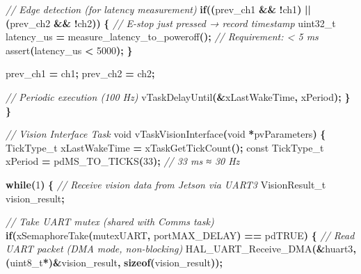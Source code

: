 \documentclass[
]{article}
\newenvironment{Shaded}{\begin{snugshade}}{\end{snugshade}}
\newcommand{\CommentTok}[1]{\textcolor[rgb]{0.56,0.35,0.01}{\textit{#1}}}
\newcommand{\ControlFlowTok}[1]{\textcolor[rgb]{0.13,0.29,0.53}{\textbf{#1}}}
\newcommand{\DataTypeTok}[1]{\textcolor[rgb]{0.13,0.29,0.53}{#1}}
\newcommand{\DecValTok}[1]{\textcolor[rgb]{0.00,0.00,0.81}{#1}}
\newcommand{\KeywordTok}[1]{\textcolor[rgb]{0.13,0.29,0.53}{\textbf{#1}}}
\newcommand{\NormalTok}[1]{#1}
\newcommand{\OperatorTok}[1]{\textcolor[rgb]{0.81,0.36,0.00}{\textbf{#1}}}
\begin{document}
\begin{Shaded}
\begin{Highlighting}[]
        \CommentTok{// Edge detection (for latency measurement)}
        \ControlFlowTok{if}\OperatorTok{((}\NormalTok{prev\_ch1 }\OperatorTok{\&\&} \OperatorTok{!}\NormalTok{ch1}\OperatorTok{)} \OperatorTok{||} \OperatorTok{(}\NormalTok{prev\_ch2 }\OperatorTok{\&\&} \OperatorTok{!}\NormalTok{ch2}\OperatorTok{))} \OperatorTok{\{}
            \CommentTok{// E{-}stop just pressed → record timestamp}
            \DataTypeTok{uint32\_t}\NormalTok{ latency\_us }\OperatorTok{=}\NormalTok{ measure\_latency\_to\_poweroff}\OperatorTok{();}
            \CommentTok{// Requirement: \textless{} 5 ms}
\NormalTok{            assert}\OperatorTok{(}\NormalTok{latency\_us }\OperatorTok{\textless{}} \DecValTok{5000}\OperatorTok{);}
        \OperatorTok{\}}

\NormalTok{        prev\_ch1 }\OperatorTok{=}\NormalTok{ ch1}\OperatorTok{;}
\NormalTok{        prev\_ch2 }\OperatorTok{=}\NormalTok{ ch2}\OperatorTok{;}

        \CommentTok{// Periodic execution (100 Hz)}
\NormalTok{        vTaskDelayUntil}\OperatorTok{(\&}\NormalTok{xLastWakeTime}\OperatorTok{,}\NormalTok{ xPeriod}\OperatorTok{);}
    \OperatorTok{\}}
\OperatorTok{\}}

\CommentTok{// Vision Interface Task}
\DataTypeTok{void}\NormalTok{ vTaskVisionInterface}\OperatorTok{(}\DataTypeTok{void} \OperatorTok{*}\NormalTok{pvParameters}\OperatorTok{)} \OperatorTok{\{}
\NormalTok{    TickType\_t xLastWakeTime }\OperatorTok{=}\NormalTok{ xTaskGetTickCount}\OperatorTok{();}
    \DataTypeTok{const}\NormalTok{ TickType\_t xPeriod }\OperatorTok{=}\NormalTok{ pdMS\_TO\_TICKS}\OperatorTok{(}\DecValTok{33}\OperatorTok{);}  \CommentTok{// 33 ms ≈ 30 Hz}

    \ControlFlowTok{while}\OperatorTok{(}\DecValTok{1}\OperatorTok{)} \OperatorTok{\{}
        \CommentTok{// Receive vision data from Jetson via UART3}
\NormalTok{        VisionResult\_t vision\_result}\OperatorTok{;}

        \CommentTok{// Take UART mutex (shared with Comms task)}
        \ControlFlowTok{if}\OperatorTok{(}\NormalTok{xSemaphoreTake}\OperatorTok{(}\NormalTok{mutexUART}\OperatorTok{,}\NormalTok{ portMAX\_DELAY}\OperatorTok{)} \OperatorTok{==}\NormalTok{ pdTRUE}\OperatorTok{)} \OperatorTok{\{}
            \CommentTok{// Read UART packet (DMA mode, non{-}blocking)}
\NormalTok{            HAL\_UART\_Receive\_DMA}\OperatorTok{(\&}\NormalTok{huart3}\OperatorTok{,} \OperatorTok{(}\DataTypeTok{uint8\_t}\OperatorTok{*)\&}\NormalTok{vision\_result}\OperatorTok{,} \KeywordTok{sizeof}\OperatorTok{(}\NormalTok{vision\_result}\OperatorTok{));}


\end{Highlighting}
\end{Shaded}
\end{document}
